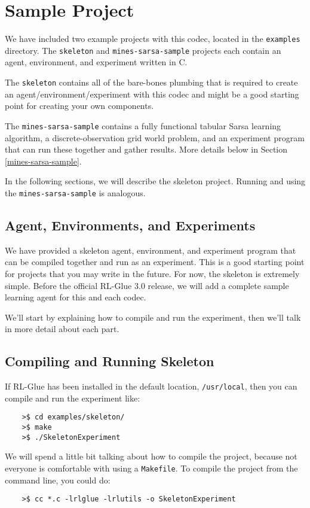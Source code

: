 \documentclass[11pt]{article}
\begin{document}
\section{Sample Project}
We have included two example projects with this codec, located in the \texttt{examples} directory.  The  \texttt{skeleton} and \texttt{mines-sarsa-sample} projects each contain an agent, environment, and experiment written in C.

The \texttt{skeleton} contains all of the bare-bones plumbing that is required to create an agent/environment/experiment with this codec and might be a good starting point for creating your own components.

The \texttt{mines-sarsa-sample} contains a fully functional tabular Sarsa learning algorithm, a discrete-observation grid world problem, and an experiment program that can run these together and gather results.  More details below in Section \ref{mines-sarsa-sample}.

In the following sections, we will describe the skeleton project.  Running and using the \texttt{mines-sarsa-sample} is analogous.


\subsection{Agent, Environments, and Experiments}
We have provided a skeleton agent, environment, and experiment program that can be compiled together and run as an experiment.
This is a good starting point for projects that you may write in the future.  For now, the skeleton is extremely simple.  Before the official RL-Glue 3.0 release, we will add a complete sample learning agent for this and each codec.

We'll start by explaining how to compile and run the experiment, then we'll talk in more detail about each part.

\subsection{Compiling and Running Skeleton}
If RL-Glue has been installed in the default location, \texttt{/usr/local}, then you can compile and run the experiment like:
\begin{verbatim}
	>$ cd examples/skeleton/
	>$ make
	>$ ./SkeletonExperiment
\end{verbatim}

We will spend a little bit talking about how to compile the project, because not everyone is comfortable with using a \texttt{Makefile}.  To compile
the project from the command line, you could do:
\begin{verbatim}
	>$ cc *.c -lrlglue -lrlutils -o SkeletonExperiment
\end{verbatim}
\end{document}
